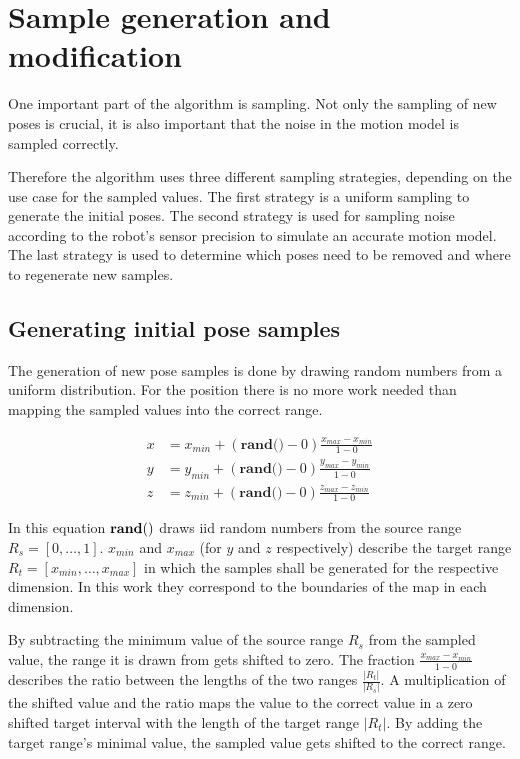 \documentclass[Thesis.tex]{subfiles}
\begin{document}
\section{Sample generation and modification}

One important part of the algorithm is sampling. Not only the sampling of new poses is crucial, it is also important that the noise in the motion model is sampled correctly. 

Therefore the algorithm uses three different sampling strategies, depending on the use case for the sampled values. The first strategy is a uniform sampling to generate the initial poses. The second strategy is used for sampling noise according to the robot's sensor precision to simulate an accurate motion model. The last strategy is used to determine which poses need to be removed and where to regenerate new samples. 

\subsection{Generating initial pose samples}
The generation of new pose samples is done by drawing random numbers from a uniform distribution. For the position there is no more work needed than mapping the sampled values into the correct range.

\begin{align}
x &= x_{min} + \left( \textbf{rand()} - 0 \right) \frac{ x_{max} - x_{min} }{ 1 - 0 } \\
y &= y_{min} + \left( \textbf{rand()} - 0 \right) \frac{ y_{max} - y_{min} }{ 1 - 0 } \\
z &= z_{min} + \left( \textbf{rand()} - 0 \right) \frac{ z_{max} - z_{min} }{ 1 - 0 } 
\end{align}

In this equation ${\bf rand()}$ draws \gls{iid} random numbers from the source range $R_s = \left[0, \dots, 1\right]$. $x_{min}$ and $x_{max}$ (for $y$ and $z$ respectively) describe the target range $R_t = \left[x_{min}, \dots, x_{max}\right]$ in which the samples shall be generated for the respective dimension. In this work they correspond to the boundaries of the map in each dimension.

By subtracting the minimum value of the source range $R_s$ from the sampled value, the range it is drawn from gets shifted to zero. The fraction $\frac{ x_{max} - x_{min} }{ 1 - 0 }$ describes the ratio between the lengths of the two ranges $\frac{|R_t|}{|R_s|}$. A multiplication of the shifted value and the ratio maps the value to the correct value in a zero shifted target interval with the length of the target range $|R_t|$. By adding the target range's minimal value, the sampled value gets shifted to the correct range.
\end{document}
